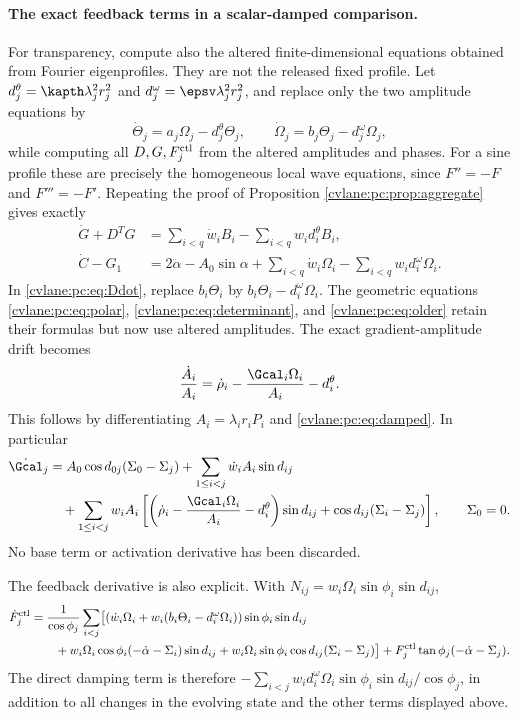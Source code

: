 \paragraph{The exact feedback terms in a scalar-damped comparison.}
For transparency, compute also the altered finite-dimensional equations obtained from Fourier eigenprofiles. They are not the released fixed profile. Let $d_j^\theta=\kapth\lambda_j^2r_j^2$ and $d_j^\omega=\epsv\lambda_j^2r_j^2$, and replace only the two amplitude equations by
\begin{equation}\label{cvlane:pc:eq:damped}
 \dot\Theta_j=a_j\Omega_j-d_j^\theta\Theta_j,\qquad
 \dot\Omega_j=b_j\Theta_j-d_j^\omega\Omega_j,
\end{equation}
while computing all $D,G,F_j^{\rm ctl}$ from the altered amplitudes and phases. For a sine profile these are precisely the homogeneous local wave equations, since $F''=-F$ and $F'''=-F'$. Repeating the proof of Proposition \ref{cvlane:pc:prop:aggregate} gives exactly
\begin{align}
 \dot G+D^TG&=\sum_{i<q}\dot w_iB_i-\sum_{i<q}w_i d_i^\theta B_i,\label{cvlane:pc:eq:damped-background}\\
 \dot C-G_1&=2\ddot\alpha-A_0\sin\alpha+\sum_{i<q}\dot w_i\Omega_i
 -\sum_{i<q}w_i d_i^\omega\Omega_i.\nonumber
\end{align}
In \eqref{cvlane:pc:eq:Ddot}, replace $b_i\Theta_i$ by $b_i\Theta_i-d_i^\omega\Omega_i$. The geometric equations \eqref{cvlane:pc:eq:polar}, \eqref{cvlane:pc:eq:determinant}, and \eqref{cvlane:pc:eq:older} retain their formulas but now use altered amplitudes. The exact gradient-amplitude drift becomes
\begin{equation}\label{cvlane:pc:eq:Adrift}
 \frac{\dot A_i}{A_i}=\dot\rho_i-\frac{\Gcal_i\Omega_i}{A_i}-d_i^\theta.
\end{equation}
This follows by differentiating $A_i=\lambda_ir_iP_i$ and \eqref{cvlane:pc:eq:damped}. In particular
\begin{align*}
 \dot\Gcal_j&=A_0\cos d_{0j}(\Sigma_0-\Sigma_j)
 +\sum_{1\le i<j}\dot w_iA_i\sin d_{ij}\\
 &\quad+\sum_{1\le i<j}w_iA_i
 \left[\left(\dot\rho_i-\frac{\Gcal_i\Omega_i}{A_i}-d_i^\theta\right)\sin d_{ij}
 +\cos d_{ij}(\Sigma_i-\Sigma_j)\right],\qquad \Sigma_0=0.
\end{align*}
No base term or activation derivative has been discarded.

The feedback derivative is also explicit. With $N_{ij}=w_i\Omega_i\sin\phi_i\sin d_{ij}$,
\begin{align*}
 \dot F_j^{\rm ctl}&=\frac1{\cos\phi_j}\sum_{i<j}\bigl[
 (\dot w_i\Omega_i+w_i(b_i\Theta_i-d_i^\omega\Omega_i))\sin\phi_i\sin d_{ij}\\
 &\qquad+w_i\Omega_i\cos\phi_i(-\dot\alpha-\Sigma_i)\sin d_{ij}
 +w_i\Omega_i\sin\phi_i\cos d_{ij}(\Sigma_i-\Sigma_j)\bigr]
 +F_j^{\rm ctl}\tan\phi_j(-\dot\alpha-\Sigma_j).
\end{align*}
The direct damping term is therefore $-\sum_{i<j}w_id_i^\omega\Omega_i\sin\phi_i\sin d_{ij}/\cos\phi_j$, in addition to all changes in the evolving state and the other terms displayed above.

